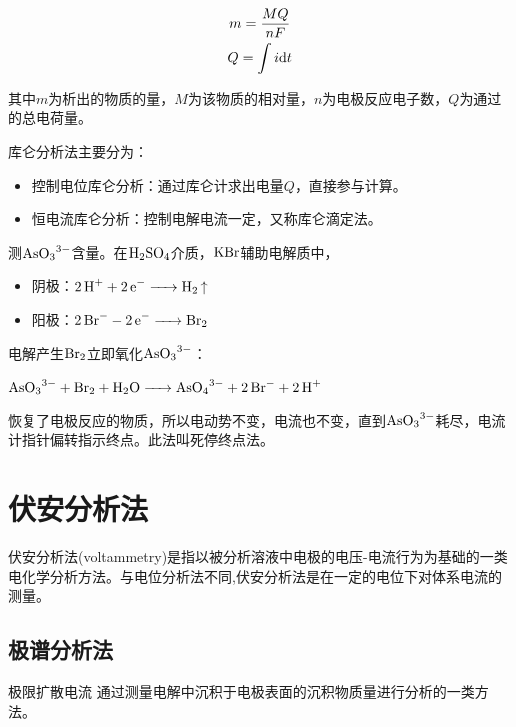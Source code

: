 \begin{gather*}
	m=\dfrac{MQ}{nF}\\
	Q=\int i\mathrm{d}t
\end{gather*}

其中$m$为析出的物质的量，$M$为该物质的相对量，$n$为电极反应电子数，$Q$为通过的总电荷量。

库仑分析法主要分为：

\begin{itemize}
	\item 控制电位库仑分析：通过库仑计求出电量$Q$，直接参与计算。
	\item 恒电流库仑分析：控制电解电流一定，又称库仑滴定法。
\end{itemize}

\begin{example}
	测$\ce{AsO3^3-}$含量。在$\ce{H2SO4}$介质，$\ce{KBr}$辅助电解质中，
	
	\begin{itemize}
		\item 阴极：$\ce{2H+ + 2e- -> H2 ^ }$
		\item 阳极：$\ce{2Br- - 2e- -> Br2}$
	\end{itemize}

	电解产生$\ce{Br2}$立即氧化$\ce{AsO3^3-}$：
	
	$\ce{AsO3^3- + Br2 + H2O -> AsO4^3- + 2Br- + 2H+}$
	
	恢复了电极反应的物质，所以电动势不变，电流也不变，直到$\ce{AsO3^3-}$耗尽，电流计指针偏转指示终点。此法叫死停终点法。
\end{example}


\section{伏安分析法}

伏安分析法(voltammetry)是指以被分析溶液中电极的电压-电流行为为基础的一类电化学分析方法。与电位分析法不同,伏安分析法是在一定的电位下对体系电流的测量。

\subsection{极谱分析法}





\begin{definition*}{极限扩散电流}{}
	通过测量电解中沉积于电极表面的沉积物质量进行分析的一类方法。
\end{definition*}

